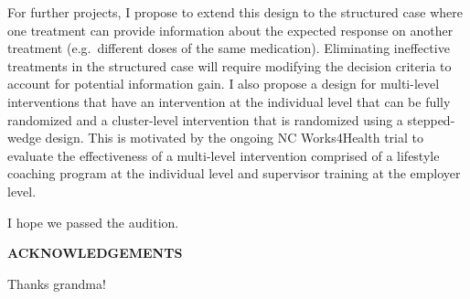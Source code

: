 \documentclass[12pt,,letterpaper,twoside]{report}
\begin{document}
For further
projects, I propose to extend this design to the structured case where
one treatment can provide information about the expected response on
another treatment (e.g.~different doses of the same medication).
Eliminating ineffective treatments in the structured case will require
modifying the decision criteria to account for potential information
gain. I also propose a design for multi-level interventions that have an
intervention at the individual level that can be fully randomized and a
cluster-level intervention that is randomized using a stepped-wedge
design. This is motivated by the ongoing NC Works4Health trial to
evaluate the effectiveness of a multi-level intervention comprised of a
lifestyle coaching program at the individual level and supervisor
training at the employer level.

\clearpage


\begin{center}
\vspace*{52pt}

\singlespacing

I hope we passed the audition.

\end{center}

\pagebreak


\begin{center}
\vspace*{52pt}
{\normalsize \textbf{ACKNOWLEDGEMENTS}}
\end{center}

Thanks grandma!

\clearpage


\renewcommand{\contentsname}{TABLE OF CONTENTS}
\renewcommand{\cfttoctitlefont}{\normalsize\bfseries}
\renewcommand{\cftaftertoctitle}{\hfill}
\renewcommand{\cftdotsep}{1.5}
\cftsetrmarg{1.0in}
\end{document}
